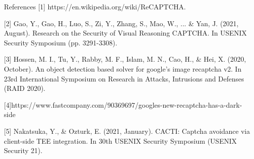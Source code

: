 \documentclass{beamer}
\begin{document}
\begin{frame}{References}
	[1] https://en.wikipedia.org/wiki/ReCAPTCHA.

	[2] Gao, Y., Gao, H., Luo, S., Zi, Y., Zhang, S., Mao, W., ... \& Yan, J. (2021, August). Research on the Security of Visual Reasoning CAPTCHA. In USENIX Security Symposium (pp. 3291-3308).

	[3] Hossen, M. I., Tu, Y., Rabby, M. F., Islam, M. N., Cao, H., \& Hei, X. (2020, October). An object detection based solver for google’s image recaptcha v2. In 23rd International Symposium on Research in Attacks, Intrusions and Defenses ({RAID} 2020).

	[4]https://www.fastcompany.com/90369697/googles-new-recaptcha-has-a-dark-side

	[5] Nakatsuka, Y., \& Ozturk, E. (2021, January). CACTI: Captcha avoidance via client-side TEE integration. In 30th USENIX Security Symposium (USENIX Security 21).
\end{frame}
\end{document}
